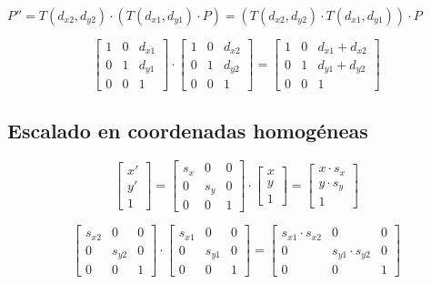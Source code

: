 $P''=T(d_{x2},d_{y2}) \cdot (T(d_{x1},d_{y1}) \cdot P)=(T(d_{x2},d_{y2}) \cdot T(d_{x1},d_{y1})) \cdot P$

$$\left[\begin{matrix}
1 & 0 & d_{x1} \\ 0 & 1 & d_{y1} \\ 0 & 0 & 1
\end{matrix}\right] \cdot
\left[\begin{matrix}
1 & 0 & d_{x2} \\ 0 & 1 & d_{y2} \\ 0 & 0 & 1
\end{matrix}\right]=
\left[\begin{matrix}
1 & 0 & d_{x1}+d_{x2} \\ 0 & 1 & d_{y1}+d_{y2} \\ 0 & 0 & 1
\end{matrix}\right]$$

\subsection{Escalado en coordenadas homogéneas}
$$\left[\begin{matrix}
x' \\ y' \\ 1
\end{matrix}\right] =
\left[\begin{matrix}
s_x & 0 & 0 \\ 0 & s_y & 0 \\ 0 & 0 & 1
\end{matrix}\right] \cdot
\left[\begin{matrix}
x \\ y \\ 1
\end{matrix}\right]=
\left[\begin{matrix}
x\cdot s_x \\ y\cdot s_y \\ 1
\end{matrix}\right]$$

$$\left[\begin{matrix}
    s_{x2} & 0 & 0 \\ 0 & s_{y2} & 0 \\ 0 & 0 & 1
\end{matrix}\right] \cdot
\left[\begin{matrix}
    s_{x1} & 0 & 0 \\ 0 & s_{y1} & 0 \\ 0 & 0 & 1
\end{matrix}\right]=
\left[\begin{matrix}
s_{x1} \cdot s_{x2} & 0 & 0 \\ 0 & s_{y1} \cdot s_{y2} & 0 \\ 0 & 0 & 1
\end{matrix}\right]$$

